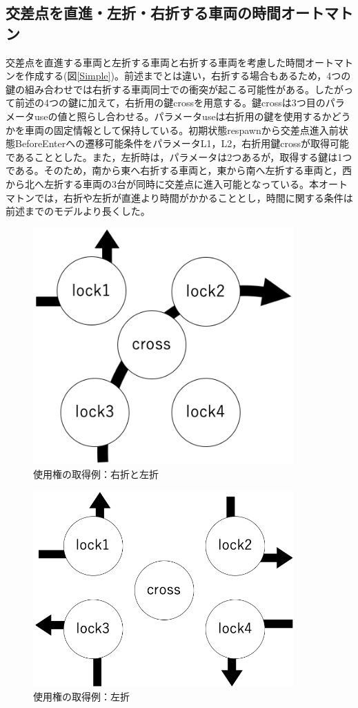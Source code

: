 \documentclass{tpu-sotu}
\begin{document}
	\subsection{交差点を直進・左折・右折する車両の時間オートマトン}
	交差点を直進する車両と左折する車両と右折する車両を考慮した時間オートマトンを作成する(図\ref{Simple})。前述までとは違い，右折する場合もあるため，4つの鍵の組み合わせでは右折する車両同士での衝突が起こる可能性がある。したがって前述の4つの鍵に加えて，右折用の鍵crossを用意する。鍵crossは3つ目のパラメータuseの値と照らし合わせる。パラメータuseは右折用の鍵を使用するかどうかを車両の固定情報として保持している。初期状態respawnから交差点進入前状態BeforeEnterへの遷移可能条件をパラメータL1，L2，右折用鍵crossが取得可能であることとした。また，左折時は，パラメータは2つあるが，取得する鍵は1つである。そのため，南から東へ右折する車両と，東から南へ左折する車両と，西から北へ左折する車両の3台が同時に交差点に進入可能となっている。本オートマトンでは，右折や左折が直進より時間がかかることとし，時間に関する条件は前述までのモデルより長くした。
	\begin{figure}[htbp]
	\centering
	\includegraphics[width=100mm]{wn-se.png}
	\caption{使用権の取得例：右折と左折}
	\label{RL}
	\end{figure}
	\begin{figure}[htbp]
	\centering
	\includegraphics[width=100mm]{leftcouse.png}
	\caption{使用権の取得例：左折}
	\label{4L}
	\end{figure}
\end{document}
